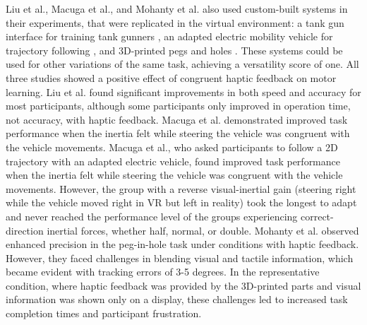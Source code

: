 Liu et al., Macuga et al., and Mohanty et al. also used custom-built systems in their experiments, that were replicated in the virtual environment: a tank gun interface for training tank gunners \cite{LiuG2014}, an adapted electric mobility vehicle for trajectory following \cite{Macuga2019}, and 3D-printed pegs and holes \cite{Mohanty2023}. These systems could be used for other variations of the same task, achieving a versatility score of one. All three studies showed a positive effect of congruent haptic feedback on motor learning. 
Liu et al. found significant improvements in both speed and accuracy for most participants, although some participants only improved in operation time, not accuracy, with haptic feedback. Macuga et al. demonstrated improved task performance when the inertia felt while steering the vehicle was congruent with the vehicle movements.  
Macuga et al., who asked participants to follow a 2D trajectory with an adapted electric vehicle, found improved task performance when the inertia felt while steering the vehicle was congruent with the vehicle movements. However, the group with a reverse visual-inertial gain (steering right while the vehicle moved right in VR but left in reality) took the longest to adapt and never reached the performance level of the groups experiencing correct-direction inertial forces, whether half, normal, or double. 
Mohanty et al. observed enhanced precision in the peg-in-hole task under conditions with haptic feedback. However, they faced challenges in blending visual and tactile information, which became evident with tracking errors of 3-5 degrees. In the representative condition, where haptic feedback was provided by the 3D-printed parts and visual information was shown only on a display, these challenges led to increased task completion times and participant frustration.

